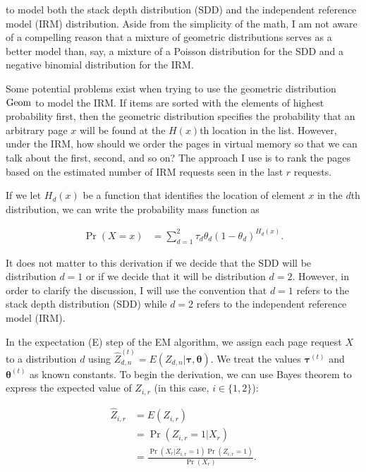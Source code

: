   \noindent to model both the stack depth distribution (SDD) and the independent
  reference model (IRM) distribution. Aside from the simplicity of the math, I
  am not aware of a compelling reason that a mixture of geometric distributions
  serves as a better model than, say, a mixture of a Poisson distribution for
  the SDD and a negative binomial distribution for the IRM.

  Some potential problems exist when trying to use the geometric distribution
  $\operatorname*{\operatorname{Geom}}$ to model the IRM. If items are sorted with the elements of highest
  probability first, then the geometric distribution specifies the probability
  that an arbitrary page $x$ will be found at the $H(x)$th location in the list.
  However, under the IRM, how should we order the pages in virtual memory so
  that we can talk about the first, second, and so on? The approach I use is to
  rank the pages based on the estimated number of IRM requests seen in the last
  $r$ requests.

  If we let $H_d(x)$ be a function that identifies the location of element $x$
  in the $d$th distribution, we can write the probability mass function as

  \begin{align}
  \label{eq:mixpdf}
    \Pr(X = x) &=
        \sum_{d = 1}^{2} \tau_d \theta_d (1 - \theta_d)^{H_d(x)} .
  \end{align}

  It does not matter to this derivation if we decide that the SDD will be
  distribution $d = 1$ or if we decide that it will be distribution $d = 2$.
  However, in order to clarify the discussion, I will use the convention that
  $d = 1$ refers to the stack depth distribution (SDD) while $d = 2$ refers to
  the independent reference model (IRM).

  In the expectation (E) step of the EM algorithm, we assign each page request
  $X$ to a distribution $d$ using
  $\hat{Z}_{d, n}^{(t)} = E(Z_{d, n} | \bm{\tau}, \bm{\theta})$. We
  treat the values $\bm{\tau}^{(t)}$ and $\bm{\theta}^{(t)}$ as known constants.
  To begin the derivation, we can use Bayes theorem to express the expected
  value of $Z_{i, r}$ (in this case, $i \in \{1, 2\}$):

  \begin{align}
    \hat{Z}_{i, r} &= E(Z_{i, r}) \\
      &= \Pr(Z_{i, r} = 1 | X_r) \\
  \label{eq:estepforz}
      &= \frac{\Pr(X_r | Z_{i, r} = 1) \Pr(Z_{i, r} = 1)}{\Pr(X_r)} .
  \end{align}

